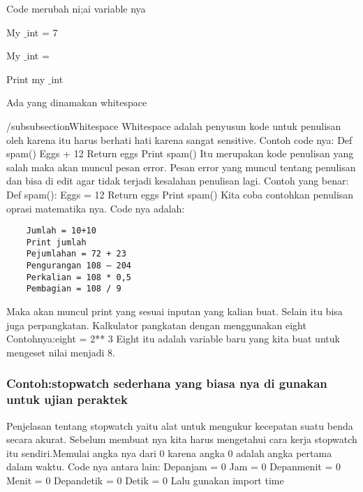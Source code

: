 {\fontsize{14pt}{14pt}\selectfont Code merubah ni;ai variable nya  \\} \par
\noindent 
{\fontsize{14pt}{14pt}\selectfont My $  \_  $int = 7 \\} \par
\noindent 
{\fontsize{14pt}{14pt}\selectfont My $  \_  $int = \\} \par
\noindent 
{\fontsize{14pt}{14pt}\selectfont Print my $  \_  $int \\} \par
\vspace{14pt}
\noindent 
{\fontsize{14pt}{14pt}\selectfont Ada yang dinamakan whitespace  \\} \par
\vspace{14pt}
\noindent 
/subsubsection{Whitespace}
Whitespace adalah penyusun kode untuk penulisan oleh karena itu harus berhati hati karena sangat sensitive.
Contoh code nya:
	Def spam() 
	Eggs + 12 
	Return eggs 
	Print spam() 
Itu merupakan kode penulisan yang salah maka akan muncul pesan error.
Pesan error yang muncul tentang penulisan dan bisa di edit agar tidak terjadi kesalahan penulisan lagi. 
Contoh yang benar: 
	Def spam(): 
	Eggs = 12 
	Return eggs 
	Print spam() 
Kita coba contohkan penulisan oprasi matematika nya. 
Code nya adalah:
\begin{verbatim}
	Jumlah = 10+10 
	Print jumlah 
	Pejumlahan = 72 + 23 
	Pengurangan 108 – 204 
	Perkalian = 108 * 0,5 
	Pembagian = 108 / 9
\end{verbatim}
Maka akan muncul print yang sesuai inputan yang kalian buat.
Selain itu bisa juga perpangkatan. Kalkulator pangkatan dengan menggunakan eight
Contohnya:eight = 2** 3 
Eight itu adalah variable baru yang kita buat untuk mengeset nilai menjadi 8.

\subsubsection{Contoh:stopwatch sederhana yang biasa nya di gunakan untuk ujian peraktek}
Penjelasan tentang stopwatch yaitu alat untuk mengukur kecepatan suatu benda secara akurat.
Sebelum membuat nya kita harus mengetahui cara kerja stopwatch itu sendiri.Memulai angka nya dari 0 karena angka 0 adalah angka pertama dalam waktu.
Code nya antara lain: 
	Depanjam = 0 
	Jam = 0 
	Depanmenit = 0 
	Menit = 0
	Depandetik = 0 
	Detik = 0 
Lalu gunakan import time 

